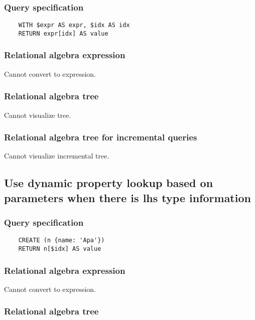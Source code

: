 	\subsubsection*{Query specification}

	\begin{lstlisting}
	WITH $expr AS expr, $idx AS idx
	RETURN expr[idx] AS value
	\end{lstlisting}


	\subsubsection*{Relational algebra expression}

	Cannot convert to expression.

	\subsubsection*{Relational algebra tree}

	Cannot visualize tree.

	\subsubsection*{Relational algebra tree for incremental queries}

	Cannot visualize incremental tree.
	\subsection{Use dynamic property lookup based on parameters when there is lhs type information}

	\subsubsection*{Query specification}

	\begin{lstlisting}
	CREATE (n {name: 'Apa'})
	RETURN n[$idx] AS value
	\end{lstlisting}


	\subsubsection*{Relational algebra expression}

	Cannot convert to expression.

	\subsubsection*{Relational algebra tree}

